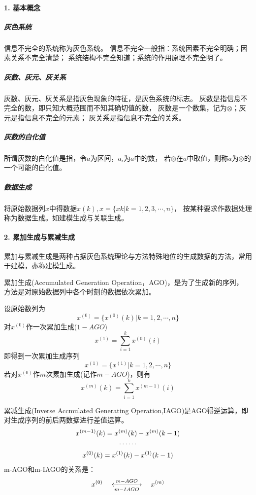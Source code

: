 \paragraph*{1. 基本概念}
\subparagraph*{灰色系统}
信息不完全的系统称为灰色系统。
信息不完全一般指：系统因素不完全明确；因素关系不完全清楚；
系统结构不完全知道；系统的作用原理不完全明了。
\subparagraph*{灰数、灰元、灰关系}
灰数、灰元、灰关系是指灰色现象的特征，是灰色系统的标志。
灰数是指信息不完全的数，即只知大概范围而不知其确切值的数，
灰数是一个数集，记为$\otimes$；灰元是指信息不完全的元素；
灰关系是指信息不完全的关系。
\subparagraph*{灰数的白化值}
所谓灰数的白化值是指，令$a$为区间，$a_i$为$a$中的数，
若$\otimes$在$a$中取值，则称$a$为$\otimes$的一个可能的白化值。
\subparagraph*{数据生成}
将原始数据列$x$中得数据$x(k), x=\{x{k}|k=1,2,3,\cdots,n\}$，
按某种要求作数据处理称为数据生成。如建模生成与关联生成。
\paragraph*{2. 累加生成与累减生成}
累加与累减生成是两种占据灰色系统理论与方法特殊地位的生成数据的方法，常用于建模，亦称建模生成。

累加生成(Accumulated Generation Operation，AGO)，是为了生成新的序列，
方法是对原始数据列中各个时刻的数据依次累加。

设原始数列为
\begin{equation}
x^{(0)}=\{x^{(0)}(k)|k=1,2,\cdots,n\}
\end{equation}
对$x^{(0)}$作一次累加生成($1-AGO$)
\begin{equation}
x^{(1)}=\sum^k_{i=1}x^{(0)}(i)
\end{equation}
即得到一次累加生成序列
\begin{equation}
x^{(1)}=\{x^{(1)}|k=1,2,\cdots,n\}
\end{equation}
若对$x^{(0)}$作$m$次累加生成(记作$m-AGO$)，则有
\begin{equation}
x^{(m)}(k)=\sum^k_{i=1} x^{(m-1)}(i)
\end{equation}

累减生成(Inverse Accmulated Generating Operation,IAGO)是AGO得逆运算，即对生成序列的前后两数据进行差值运算。
\begin{gather}
x^{(m-1)}(k)=x^{(m)}(k)-x^{(m)}(k-1) \notag \\
\cdots\cdots \\
x^{(0)}(k)=x^{(1)}(k)-x^{(1)}(k-1)  \notag
\end{gather}
m-AGO和m-IAGO的关系是：
\begin{equation}
x^{(0)} \quad \xleftrightarrow[m-IAGO]{m-AGO} \quad x^{(m)}
\end{equation}

